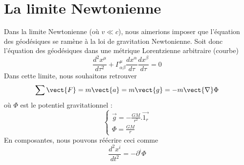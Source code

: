 \section{La limite Newtonienne}
Dans la limite Newtonienne (où $v \ll c$), nous aimerions imposer que l'équation des géodésiques se ramène à la loi de gravitation Newtonienne. Soit donc l'équation des géodésiques dans une métrique Lorentzienne arbitraire (courbe)
\begin{equation}
    \frac{d^2x^{\mu}}{d\tau^2} + \Gamma^{\mu}_{\alpha \beta}\frac{dx^{\alpha}}{d\tau}\frac{dx^{\beta}}{d\tau} = 0
\end{equation}
Dans cette limite, nous souhaitons retrouver 
\begin{equation}
    \sum \vect{F} = m\vect{a} = m\vect{g} = -m\vect{\nabla}\Phi
\end{equation}
où $\Phi$ est le potentiel gravitationnel :
\begin{equation}
\left\{
\begin{array}{l}
\Vec{g} = -\frac{GM}{r^2}.\Vec{1_{r}}\\
\Phi = \frac{GM}{r}
\end{array}
\right.
\end{equation}
En composantes, nous pouvons réécrire ceci comme
\begin{equation}
    \frac{d^2x^{i}}{dt^2} = -\partial^{i}\Phi
\end{equation}

